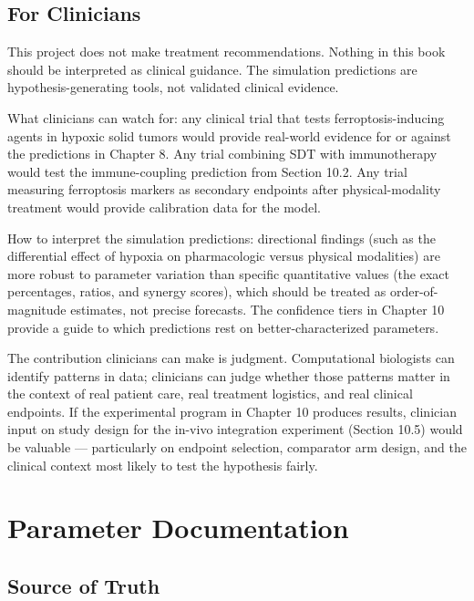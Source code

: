 \documentclass[11pt,twoside,openright]{report}
\begin{document}
\section{For Clinicians}

This project does not make treatment recommendations. Nothing in this book should be interpreted as clinical guidance. The simulation predictions are hypothesis-generating tools, not validated clinical evidence.

What clinicians can watch for: any clinical trial that tests ferroptosis-inducing agents in hypoxic solid tumors would provide real-world evidence for or against the predictions in Chapter 8. Any trial combining SDT with immunotherapy would test the immune-coupling prediction from Section 10.2. Any trial measuring ferroptosis markers as secondary endpoints after physical-modality treatment would provide calibration data for the model.

How to interpret the simulation predictions: directional findings (such as the differential effect of hypoxia on pharmacologic versus physical modalities) are more robust to parameter variation than specific quantitative values (the exact percentages, ratios, and synergy scores), which should be treated as order-of-magnitude estimates, not precise forecasts. The confidence tiers in Chapter 10 provide a guide to which predictions rest on better-characterized parameters.

The contribution clinicians can make is judgment. Computational biologists can identify patterns in data; clinicians can judge whether those patterns matter in the context of real patient care, real treatment logistics, and real clinical endpoints. If the experimental program in Chapter 10 produces results, clinician input on study design for the in-vivo integration experiment (Section 10.5) would be valuable --- particularly on endpoint selection, comparator arm design, and the clinical context most likely to test the hypothesis fairly.



\appendix
\chapter{Parameter Documentation}

\section{Source of Truth}
\end{document}
